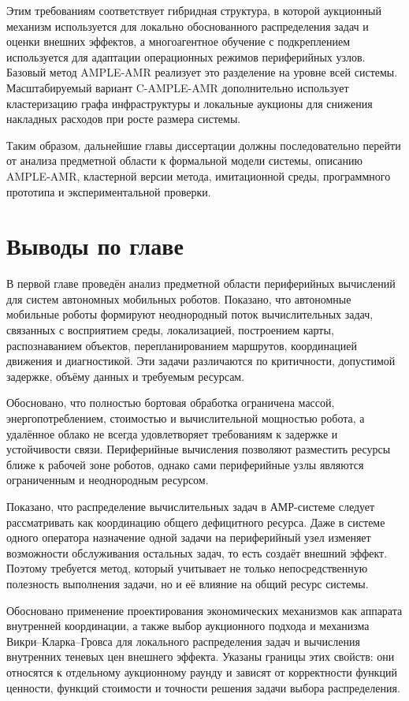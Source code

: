 Этим требованиям соответствует гибридная структура, в которой аукционный механизм используется для локально обоснованного распределения задач и оценки внешних эффектов, а многоагентное обучение с подкреплением используется для адаптации операционных режимов периферийных узлов. Базовый метод AMPLE-AMR реализует это разделение на уровне всей системы. Масштабируемый вариант C-AMPLE-AMR дополнительно использует кластеризацию графа инфраструктуры и локальные аукционы для снижения накладных расходов при росте размера системы.

Таким образом, дальнейшие главы диссертации должны последовательно перейти от
анализа предметной области к формальной модели системы, описанию AMPLE-AMR,
кластерной версии метода, имитационной среды, программного прототипа и
экспериментальной проверки.

\section{Выводы по главе}

В первой главе проведён анализ предметной области периферийных вычислений для систем автономных мобильных роботов. Показано, что автономные мобильные роботы формируют неоднородный поток вычислительных задач, связанных с восприятием среды, локализацией, построением карты, распознаванием объектов, перепланированием маршрутов, координацией движения и диагностикой. Эти задачи различаются по критичности, допустимой задержке, объёму данных и требуемым ресурсам.

Обосновано, что полностью бортовая обработка ограничена массой, энергопотреблением, стоимостью и вычислительной мощностью робота, а удалённое облако не всегда удовлетворяет требованиям к задержке и устойчивости связи. Периферийные вычисления позволяют разместить ресурсы ближе к рабочей зоне роботов, однако сами периферийные узлы являются ограниченным и неоднородным ресурсом.

Показано, что распределение вычислительных задач в АМР-системе следует рассматривать как координацию общего дефицитного ресурса. Даже в системе одного оператора назначение одной задачи на периферийный узел изменяет возможности обслуживания остальных задач, то есть создаёт внешний эффект. Поэтому требуется метод, который учитывает не только непосредственную полезность выполнения задачи, но и её влияние на общий ресурс системы.

Обосновано применение проектирования экономических механизмов как аппарата внутренней координации, а также выбор аукционного подхода и механизма Викри--Кларка--Гровса для локального распределения задач и вычисления внутренних теневых цен внешнего эффекта. Указаны границы этих свойств: они относятся к отдельному аукционному раунду и зависят от корректности функций ценности, функций стоимости и точности решения задачи выбора распределения.

